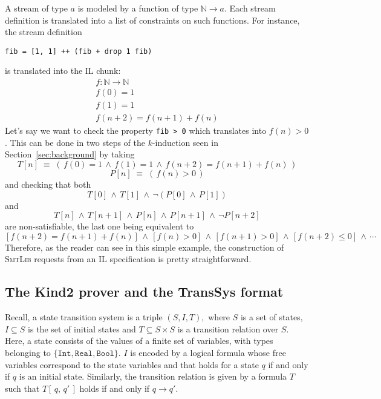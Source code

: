 A stream of type $a$ is modeled by a function of type $\mathbb{N} \to a$. Each stream definition is translated into a list of constraints on such functions. For instance, the stream definition
\begin{lstlisting}
fib = [1, 1] ++ (fib + drop 1 fib)
\end{lstlisting}
is translated into the IL chunk:
$$
\begin{array}{c}
f: \mathbb{N} \to \mathbb{N} \\
f(0) = 1 \\
f(1) = 1 \\
f(n + 2) = f(n + 1) + f(n)
\end{array}
$$
Let's say we want to check the property \texttt{fib > 0} which translates into $f(n) > 0$. This can be done in two steps of the $k$-induction seen in Section~\ref{sec:background} by taking \[T[n] \;\equiv\; \left(\, f(0) = 1 \,\wedge\,
f(1) = 1 \,\wedge\, f(n + 2) = f(n + 1) + f(n) \,\right) \] \[P[n] \;\equiv\; \left(\, f(n) > 0 \,\right) \]
and checking that both \[T[0] \,\wedge\, T[1] \,\wedge\, \neg \left( P[0] \,\wedge\, P[1] \right) \] and \[T[n] \,\wedge\, T[n + 1] \,\wedge\, P[n] \,\wedge\, P[n + 1] \,\wedge\, \neg P[n + 2] \]
are non-satisfiable, the last one being equivalent to \[ \left[f(n+2) = f(n+1) + f(n)\right] \,\wedge\, \left[f(n) > 0\right] \,\wedge\, \left[f(n + 1) > 0\right] \,\wedge\, \left[f(n + 2) \leq 0\right]   \,\wedge\, \cdots \]
Therefore, as the reader can see in this simple example, the construction of \textsc{SmtLib} requests from an IL specification is pretty straightforward.


\subsection{The Kind2 prover and the {TransSys} format}

Recall, a state transition system is a triple $(S,I,T),$
where $S$ is a set of states, $I \subseteq S$ is the set of initial
states and $T \subseteq S \times S $ is a transition relation over $S$.
Here, a state consists of  the values of a finite set of variables, with types belonging to $\{ \texttt{Int}, \texttt{Real},  \texttt{Bool}\}$. $I$ is encoded by a logical formula whose free variables correspond to the state variables and that holds for a state $q$ if and only if $q$ is an initial state. Similarly, the transition relation is given by a formula $T$ such that $T\left[\, q, \, q' \,\right]$ holds if and only if $q \rightarrow q'$. 

